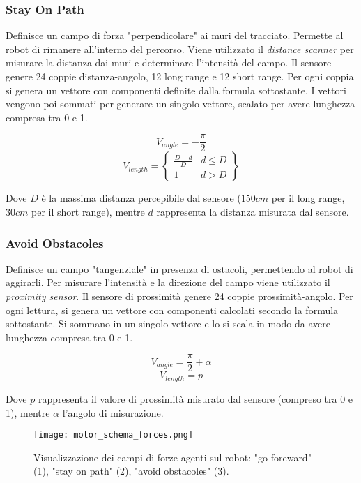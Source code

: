 \documentclass[UTF8]{article}
\begin{document}
 

 \subsubsection{Stay On Path} 
 Definisce un campo di forza "perpendicolare" ai muri del tracciato. Permette al robot di rimanere all'interno del percorso.
 Viene utilizzato il \textit{distance scanner} per misurare la distanza dai muri e determinare l'intensità del campo.
 Il sensore genere 24 coppie distanza-angolo, 12 long range e 12 short range. Per ogni coppia si genera un vettore con componenti definite dalla formula sottostante.
 I vettori vengono poi sommati per generare un singolo vettore, scalato per avere lunghezza compresa tra 0 e 1.

\[V_{angle} = -\frac{\pi}{2}\]
\[V_{length} = \left\{\begin{array}{lr}
 \frac{D-d}{D} & d \leq D\\
 1 &  d > D
 \end{array}\right\}\]
 
 Dove $D$ è la massima distanza percepibile dal sensore ($150cm$ per il long range, $30cm$ per il short range), mentre $d$ rappresenta la distanza misurata dal sensore.
 
 \subsubsection{Avoid Obstacoles} 
 Definisce un campo "tangenziale" in presenza di ostacoli, permettendo al robot di aggirarli.
 Per misurare l'intensità e la direzione del campo viene utilizzato il \textit{proximity sensor}.
 Il sensore di prossimità genere 24 coppie prossimità-angolo. Per ogni lettura, si genera un vettore con componenti calcolati secondo la formula sottostante. Si sommano in un singolo vettore e lo si scala in modo da avere lunghezza compresa tra 0 e 1.
 

 \[V_{angle} = \frac{\pi}{2} + \alpha\]
\[V_{length} = p\]

Dove $p$ rappresenta il valore di prossimità misurato dal sensore (compreso tra 0 e 1),  mentre $\alpha$ l'angolo di misurazione.

\begin{figure}[h]
\centering
\texttt{[image: motor\_schema\_forces.png]}
\caption{Visualizzazione dei campi di forze agenti sul robot: "go foreward" (1), "stay on path" (2), "avoid obstacoles" (3). }
\label{fig:motor_schema_forces}
\end{figure}
\end{document}
